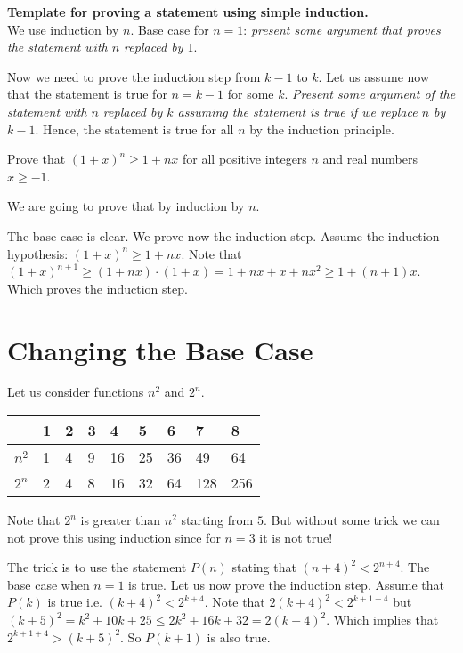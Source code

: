 \begin{template}
  \textbf{Template for proving a statement using simple induction.} \\

  We use induction by $n$. Base case for $n = 1$: \emph{present some argument 
  that proves the statement with $n$ replaced by $1$}. 

  Now we need to prove the induction step from $k - 1$ to $k$. Let us assume now
  that the statement is true for $n = k - 1$ for some $k$. \emph{Present some
  argument of the statement with $n$ replaced by $k$ assuming the statement is
  true if we replace $n$ by $k - 1$}. Hence, the statement is true for all $n$
  by the induction principle.
\end{template}


\begin{exercise}
  Prove that $(1 + x)^n \ge 1 + nx$ for all positive integers $n$ and real
  numbers $x \ge -1$.
\end{exercise}
\begin{solution}
  We are going to prove that by induction by $n$.

  The base case is clear. We prove now the induction step. Assume the
  induction hypothesis: $(1 + x)^n \ge 1 + nx$. Note that  $(1 + x)^{n + 1} \ge
  (1 + nx) \cdot (1 + x) = 1 + nx + x + nx^2 \ge 1 + (n + 1)x$. Which proves the
  induction step.
\end{solution}

\section{Changing the Base Case}
Let us consider functions $n^2$ and $2^n$.

\begin{center}
    \begin{tabular}{l  l  l  l  l  l  l  l  l}
        \toprule
              & 1 & 2 & 3 & 4  & 5  & 6  & 7   & 8   \\
        \midrule
        $n^2$ & 1 & 4 & 9 & 16 & 25 & 36 & 49  & 64  \\
        $2^n$ & 2 & 4 & 8 & 16 & 32 & 64 & 128 & 256 \\
        \bottomrule
    \end{tabular}
\end{center}
Note that $2^n$ is greater than $n^2$ starting from $5$. But without some trick
we can not prove this using induction since for $n = 3$ it is not true!

The trick is to use the statement $P(n)$ stating that $(n + 4)^2 < 2^{n + 4}$.
The base case when $n = 1$ is true.
Let us now prove the induction step. Assume that $P(k)$ is true i.e.
$(k + 4)^2 < 2^{k + 4}$. Note that $2(k + 4)^2 < 2^{k + 1 + 4}$ but
$(k + 5)^2 = k^2 + 10k + 25 \le 2k^2 + 16k + 32 = 2(k + 4)^2$.
Which implies that
$2^{k + 1 + 4} > (k + 5)^2$. So $P(k + 1)$ is also true.

